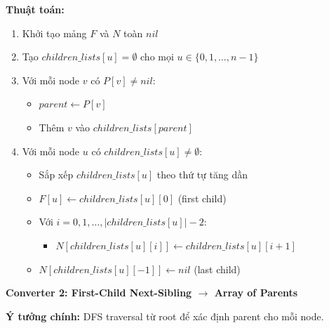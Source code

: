 \documentclass[12pt,a4paper]{article}
\begin{document}
\textbf{Thuật toán:}
\begin{enumerate}
    \item Khởi tạo mảng $F$ và $N$ toàn $nil$
    \item Tạo $children\_lists[u] = \emptyset$ cho mọi $u \in \{0, 1, \ldots, n-1\}$
    \item Với mỗi node $v$ có $P[v] \neq nil$:
    \begin{itemize}
        \item $parent \leftarrow P[v]$
        \item Thêm $v$ vào $children\_lists[parent]$
    \end{itemize}
    \item Với mỗi node $u$ có $children\_lists[u] \neq \emptyset$:
    \begin{itemize}
        \item Sắp xếp $children\_lists[u]$ theo thứ tự tăng dần
        \item $F[u] \leftarrow children\_lists[u][0]$ (first child)
        \item Với $i = 0, 1, \ldots, |children\_lists[u]| - 2$:
        \begin{itemize}
            \item $N[children\_lists[u][i]] \leftarrow children\_lists[u][i+1]$
        \end{itemize}
        \item $N[children\_lists[u][-1]] \leftarrow nil$ (last child)
    \end{itemize}
\end{enumerate}


\vspace{0.5cm}

\textbf{Converter 2: First-Child Next-Sibling $\rightarrow$ Array of Parents}
\vspace{0.5cm}

\textbf{Ý tưởng chính:} DFS traversal từ root để xác định parent cho mỗi node.
\end{document}

